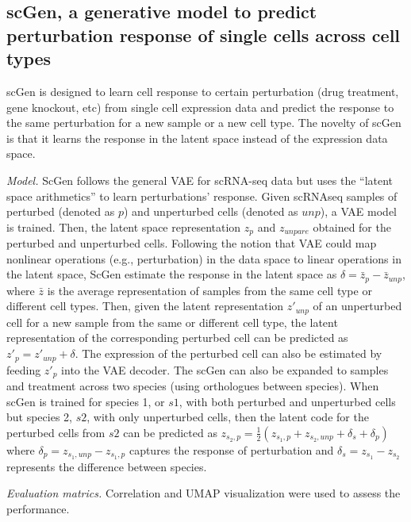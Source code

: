 \documentclass[
]{book}
\begin{document}
\hypertarget{ch-5-7-2}{%
\subsection{scGen, a generative model to predict perturbation response of single cells across cell types}\label{ch-5-7-2}}

scGen \citep{RN179} is designed to learn cell response to certain perturbation (drug treatment, gene knockout, etc) from single cell expression data and predict the response to the same perturbation for a new sample or a new cell type. The novelty of scGen is that it learns the response in the latent space instead of the expression data space.

\emph{Model.} ScGen follows the general VAE for scRNA-seq data but uses the ``latent space arithmetics'' to learn perturbations' response. Given scRNAseq samples of perturbed (denoted as \(p\)) and unperturbed cells (denoted as \(unp\)), a VAE model is trained. Then, the latent space representation \(z_{p}\) and \(z_{unpare}\) obtained for the perturbed and unperturbed cells. Following the notion that VAE could map nonlinear operations (e.g., perturbation) in the data space to linear operations in the latent space, ScGen estimate the response in the latent space as \(\delta=\bar{z}_{p}-\bar{z}_{unp}\), where \(\bar{z}\) is the average representation of samples from the same cell type or different cell types. Then, given the latent representation \(z'_{unp}\) of an unperturbed cell for a new sample from the same or different cell type, the latent representation of the corresponding perturbed cell can be predicted as \(z'_{p}=z'_{unp}+\delta\). The expression of the perturbed cell can also be estimated by feeding \(z'_{p}\) into the VAE decoder. The scGen can also be expanded to samples and treatment across two species (using orthologues between species). When scGen is trained for species 1, or \(s1\), with both perturbed and unperturbed cells but species 2, \(s2\), with only unperturbed cells, then the latent code for the perturbed cells from \(s2\) can be predicted as \(z_{s_{2},p} = \frac{1}{2}(z_{s_{1},p} + z_{s_{2},unp} + \delta_{s} + \delta_{p})\) where \(\delta_{p} = z_{s_{1},unp} - z_{s_{1},p}\) captures the response of perturbation and \(\delta_{s} = z_{s_{1}}-z_{s_{2}}\) represents the difference between species.

\emph{Evaluation matrics.} Correlation and UMAP visualization were used to assess the performance.
\end{document}
